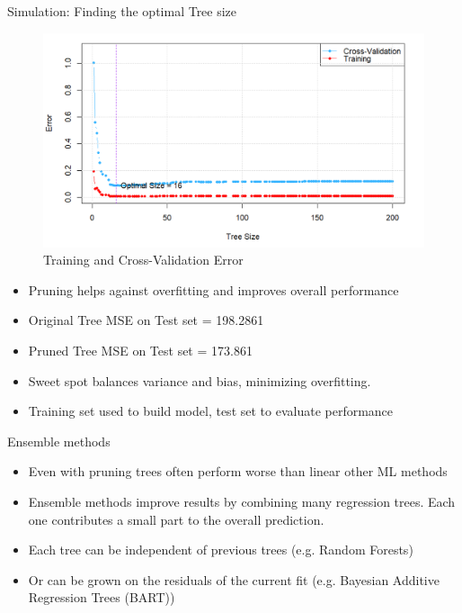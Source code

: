 \documentclass[10pt]{beamer}
\begin{document}
\begin{frame}{Simulation: Finding the optimal Tree size}
    \begin{figure}
        \centering
        \includegraphics[scale=0.40]{Pruning.png}
        \caption{Training and Cross-Validation Error}
        \label{fig:sub10}  %
    \end{figure}
    \begin{itemize}
        \item Pruning helps against overfitting and improves overall performance
        \item Original Tree MSE on Test set = 198.2861 
        \item Pruned Tree MSE on Test set = 173.861 
        \item Sweet spot balances variance and bias, minimizing overfitting.
        \item Training set used to build model, test set to evaluate performance
    \end{itemize}
\end{frame}


\begin{frame}{Ensemble methods}
    \begin{itemize}
        \item Even with pruning trees often perform worse than linear other ML methods
        \item Ensemble methods improve results by combining many regression trees. Each one contributes a small part to the overall prediction.
        \item Each tree can be independent of previous trees (e.g. Random Forests)
        \item Or can be grown on the residuals of the current fit (e.g. Bayesian Additive Regression Trees (BART))
    \end{itemize}
\end{frame}
\end{document}
